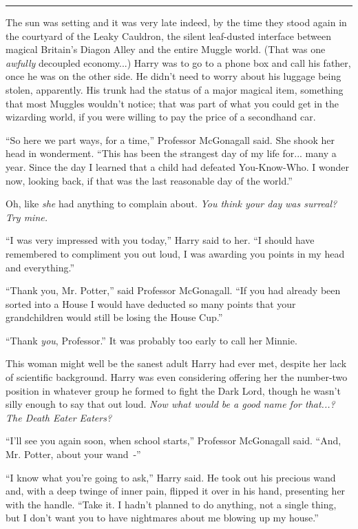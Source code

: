 \begin{center}\rule{3in}{0.4pt}\end{center}

The sun was setting and it was very late indeed, by the time they stood again in the courtyard of the Leaky Cauldron, the silent leaf-dusted interface between magical Britain's Diagon Alley and the entire Muggle world. (That was one \emph{awfully} decoupled economy...) Harry was to go to a phone box and call his father, once he was on the other side. He didn't need to worry about his luggage being stolen, apparently. His trunk had the status of a major magical item, something that most Muggles wouldn't notice; that was part of what you could get in the wizarding world, if you were willing to pay the price of a secondhand car.

``So here we part ways, for a time,'' Professor McGonagall said. She shook her head in wonderment. ``This has been the strangest day of my life for... many a year. Since the day I learned that a child had defeated You-Know-Who. I wonder now, looking back, if that was the last reasonable day of the world.''

Oh, like \emph{she} had anything to complain about. \emph{You think your day} \emph{was surreal? Try mine.}

``I was very impressed with you today,'' Harry said to her. ``I should have remembered to compliment you out loud, I was awarding you points in my head and everything.''

``Thank you, Mr. Potter,'' said Professor McGonagall. ``If you had already been sorted into a House I would have deducted so many points that your grandchildren would still be losing the House Cup.''

``Thank \emph{you}, Professor.'' It was probably too early to call her Minnie.

This woman might well be the sanest adult Harry had ever met, despite her lack of scientific background. Harry was even considering offering her the number-two position in whatever group he formed to fight the Dark Lord, though he wasn't silly enough to say that out loud. \emph{Now what would be a good name for that...? The Death Eater Eaters?}

``I'll see you again soon, when school starts,'' Professor McGonagall said. ``And, Mr. Potter, about your wand~-''

``I know what you're going to ask,'' Harry said. He took out his precious wand and, with a deep twinge of inner pain, flipped it over in his hand, presenting her with the handle. ``Take it. I hadn't planned to do anything, not a single thing, but I don't want you to have nightmares about me blowing up my house.''

